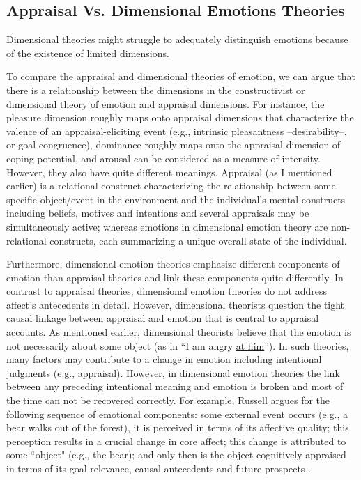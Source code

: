 \documentclass[12pt]{report}
\begin{document}
\subsection{Appraisal Vs. Dimensional Emotions Theories}

Dimensional theories might struggle to adequately distinguish emotions because
of the existence of limited dimensions.

To compare the appraisal and dimensional theories of emotion, we can argue that
there is a relationship between the dimensions in the constructivist or
dimensional theory of emotion and appraisal dimensions. For instance, the
pleasure dimension roughly maps onto appraisal dimensions that characterize the
valence of an appraisal-eliciting event (e.g., intrinsic pleasantness
--desirability--, or goal congruence), dominance roughly maps onto the appraisal
dimension of coping potential, and arousal can be considered as a measure of
intensity. However, they also have quite different meanings. Appraisal (as I
mentioned earlier) is a relational construct characterizing the relationship
between some specific object/event in the environment and the individual's
mental constructs including beliefs, motives and intentions and several
appraisals may be simultaneously active; whereas emotions in dimensional emotion
theory are non-relational constructs, each summarizing a unique overall state of
the individual.

Furthermore, dimensional emotion theories emphasize different components of
emotion than appraisal theories and link these components quite differently.
In contrast to appraisal theories, dimensional emotion theories do not address
affect’s antecedents in detail. However, dimensional theorists question the
tight causal linkage between appraisal and emotion that is central to appraisal
accounts. As mentioned earlier, dimensional theorists believe that the emotion
is not necessarily about some object (as in ``I am angry \underline{at him}'').
In such theories, many factors may contribute to a change in emotion including
intentional judgments (e.g., appraisal). However, in dimensional emotion
theories the link between any preceding intentional meaning and emotion is
broken and most of the time can not be recovered correctly. For example, Russell
argues for the following sequence of emotional components: some external event
occurs (e.g., a bear walks out of the forest), it is perceived in terms of its
affective quality; this perception results in a crucial change in core affect;
this change is attributed to some ``object" (e.g., the bear); and only then is
the object cognitively appraised in terms of its goal relevance, causal
antecedents and future prospects \cite{marsella:computational-models}.
\end{document}
